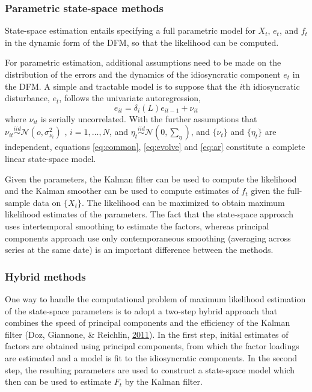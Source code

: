 \documentclass[12pt,twoside]{reedthesis}
\begin{document}
\hypertarget{parametric-state-space-methods}{%
\subsubsection{Parametric state-space methods}\label{parametric-state-space-methods}}

State-space estimation entails specifying a full parametric model for \(X_{t}\), \(e_{t}\), and \(f_{t}\) in the dynamic form of the DFM, so that the likelihood can be computed.

For parametric estimation, additional assumptions need to be made on the distribution of the errors and the dynamics of the idiosyncratic component \(e_{t}\) in the DFM. A simple and tractable model is to suppose that the \(i\)th idiosyncratic disturbance, \(e_{t}\), follows the univariate autoregression,
\begin{equation}
  e_{it} = \delta_{i} (L) e_{it - 1} + \nu_{it} \label{eq:ar}
\end{equation}
where \(\nu_{it}\) is serially uncorrelated. With the further assumptions that \(\nu_{it} \stackrel{iid}{\sim} \mathcal{N}(o, \sigma_{\nu_{i}}^{2})\) , \(i = 1, \ldots, N\), and \(\eta_{t} \stackrel{iid}{\sim} \mathcal{N}(0, \sum_{\eta})\), and \(\{\nu_{t}\}\) and \(\{\eta_{t}\}\) are independent, equations \eqref{eq:common}, \eqref{eq:evolve} and \eqref{eq:ar} constitute a complete linear state-space model.

Given the parameters, the Kalman filter can be used to compute the likelihood and the Kalman smoother can be used to compute estimates of \(f_{t}\) given the full-sample data on \(\{X_{t}\}\). The likelihood can be maximized to obtain maximum likelihood estimates of the parameters. The fact that the state-space approach uses intertemporal smoothing to estimate the factors, whereas principal components approach use only contemporaneous smoothing (averaging across series at the same date) is an important difference between the methods.

\hypertarget{hybrid-methods}{%
\subsubsection{Hybrid methods}\label{hybrid-methods}}

One way to handle the computational problem of maximum likelihood estimation of the state-space parameters is to adopt a two-step hybrid approach that combines the speed of principal components and the efficiency of the Kalman filter (Doz, Giannone, \& Reichlin, \protect\hyperlink{ref-dozetal:2011}{2011}). In the first step, initial estimates of factors are obtained using principal components, from which the factor loadings are estimated and a model is fit to the idiosyncratic components. In the second step, the resulting parameters are used to construct a state-space model which then can be used to estimate \(F_{t}\) by the Kalman filter.
\end{document}
